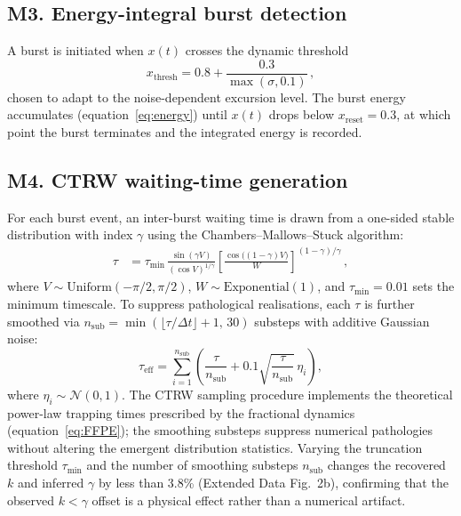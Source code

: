 \subsection*{M3. Energy-integral burst detection}

A burst is initiated when $x(t)$ crosses the dynamic threshold
\begin{equation}
x_{\mathrm{thresh}} = 0.8 + \frac{0.3}{\max(\sigma, 0.1)}\,,
\tag{M3}
\label{eq:M3}
\end{equation}
chosen to adapt to the noise-dependent excursion level. The burst energy accumulates (equation~\ref{eq:energy}) until $x(t)$ drops below $x_{\mathrm{reset}} = 0.3$, at which point the burst terminates and the integrated energy is recorded.

\subsection*{M4. CTRW waiting-time generation}

For each burst event, an inter-burst waiting time is drawn from a one-sided stable distribution with index $\gamma$ using the Chambers--Mallows--Stuck algorithm\cite{chambers1976}:
\begin{align}
\tau &= \tau_{\min}\,\frac{\sin(\gamma V)}{(\cos V)^{1/\gamma}}\left[\frac{\cos\bigl((1-\gamma)V\bigr)}{W}\right]^{(1-\gamma)/\gamma}\,,
\tag{M4}
\label{eq:M4}
\end{align}
where $V \sim \mathrm{Uniform}(-\pi/2, \pi/2)$, $W \sim \mathrm{Exponential}(1)$, and $\tau_{\min} = 0.01$ sets the minimum timescale. To suppress pathological realisations, each $\tau$ is further smoothed via $n_{\mathrm{sub}} = \min(\lfloor\tau/\Delta t\rfloor + 1,\, 30)$ substeps with additive Gaussian noise:
\begin{equation}
\tau_{\mathrm{eff}} = \sum_{i=1}^{n_{\mathrm{sub}}} \left(\frac{\tau}{n_{\mathrm{sub}}} + 0.1\sqrt{\frac{\tau}{n_{\mathrm{sub}}}}\,\eta_i\right),
\tag{M5}
\label{eq:M5}
\end{equation}
where $\eta_i \sim \mathcal{N}(0,1)$. The CTRW sampling procedure implements the theoretical power-law trapping times prescribed by the fractional dynamics (equation~\ref{eq:FFPE}); the smoothing substeps suppress numerical pathologies without altering the emergent distribution statistics. Varying the truncation threshold $\tau_{\min}$ and the number of smoothing substeps $n_{\mathrm{sub}}$ changes the recovered $k$ and inferred $\gamma$ by less than 3.8\% (Extended Data Fig.~2b), confirming that the observed $k < \gamma$ offset is a physical effect rather than a numerical artifact.

